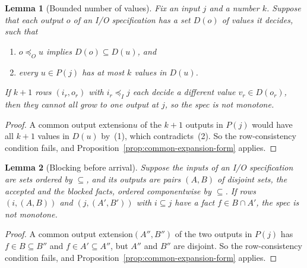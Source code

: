 \documentclass[sigconf]{cidr-2027}
\newtheorem{lemma}{Lemma}
\theoremstyle{remark}
\newcommand{\InputOrd}{\preceq_I}
\newcommand{\OutputOrd}{\preceq_O}
\newcommand{\outnoun}{output extension\xspace}%
\newcommand{\spectype}[1][]{I/O specification#1\xspace}
\newcommand{\fiber}[1]{P(#1)}
\begin{document}
\begin{lemma}[Bounded number of values]
\label{lem:bounded-values}
Fix an input $j$ and a number $k$. Suppose that each output $o$ of an
\spectype has a set $D(o)$ of values it decides, such that
\begin{enumerate}
\item
$o\OutputOrd u$ implies $D(o)\subseteq D(u)$, and
\item
every $u\in\fiber{j}$ has at most $k$ values in $D(u)$.
\end{enumerate}
If $k+1$ rows $(i_r,o_r)$ with $i_r\InputOrd j$ each decide a different value
$v_r\in D(o_r)$, then they cannot all grow to one output at $j$, so the spec is
not monotone.
\end{lemma}

\begin{proof}
A common \outnoun $u$ of the $k+1$ outputs in $\fiber{j}$ would have all
$k+1$ values in $D(u)$ by~(1), which contradicts~(2). So the row-consistency
condition fails, and Proposition~\ref{prop:common-expansion-form} applies.
\end{proof}

\begin{lemma}[Blocking before arrival]
\label{lem:blocking}
Suppose the inputs of an \spectype are sets ordered by $\subseteq$, and its
outputs are pairs $(A,B)$ of disjoint sets, the accepted and the blocked
facts, ordered componentwise by $\subseteq$. If rows $(i,(A,B))$ and
$(j,(A',B'))$ with $i\subseteq j$ have a fact $f\in B\cap A'$, the spec is not
monotone.
\end{lemma}

\begin{proof}
A common \outnoun $(A'',B'')$ of the two outputs in $\fiber{j}$ has
$f\in B\subseteq B''$ and $f\in A'\subseteq A''$, but $A''$ and $B''$ are
disjoint. So the row-consistency condition fails, and
Proposition~\ref{prop:common-expansion-form} applies.
\end{proof}
\end{document}
